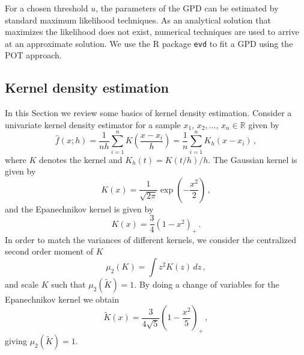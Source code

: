 \documentclass[letter,12pt]{article}
\begin{document}
For a chosen threshold $u$, the parameters of the GPD can be estimated by standard maximum likelihood techniques. As an analytical solution that maximizes the likelihood does not exist, numerical techniques are used to arrive at an approximate solution. We use the R package \texttt{evd} to fit a GPD using the POT approach.  

\subsection{Kernel density estimation}\label{subsec:kde}
In this Section we review some basics of kernel density estimation. Consider a univariate kernel density estimator for a sample ${x}_1$, ${x}_2, \ldots$,  ${x}_n \in \mathbb{R}$ given by
\begin{equation}\label{eq:kde1}
\hat{f}(x;h) = \frac{1}{nh}\sum_{i=1}^n K\left(\frac{x-x_i}{h}\right) = \frac{1}{n} \sum_{i=1}^n K_h(x-x_i)\, , 
\end{equation}
where $K$ denotes the kernel and $K_h(t) = K(t/h)/h$. The Gaussian kernel is given by
\begin{equation}\label{eq:kde2}
    K(x) = \frac{1}{\sqrt{2\pi }}{\exp\left(-\frac{x^2}{2}\right)} \, , 
\end{equation}
and the Epanechnikov kernel is given by
\begin{equation}\label{eq:kde3}
    K(x) = \frac{3}{4}\left(1 - x^2 \right)_+ \, .
\end{equation}
In order to match the variances of different kernels, we consider the centralized second order moment of $K$ 
\begin{equation}\label{eq:kde4}
 \mu_2(K) = \int z^2 K(z) \, dz \, , 
\end{equation}
and scale $K$ such that $\mu_2(\tilde{K}) = 1$. By doing a change of variables for the Epanechnikov kernel we obtain
\begin{equation}\label{eq:kde5}
    \tilde{K}(x) = \frac{3}{4 \sqrt{5}}\left(1 - \frac{x^2}{5} \right)_+ \, ,
\end{equation}
giving $\mu_2(\tilde{K}) = 1$. 
\end{document}
